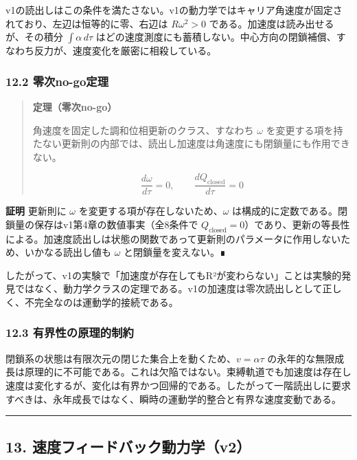 \documentclass[
  a4paper,
]{ltjsarticle}
\begin{document}
v1の読出しはこの条件を満たさない。v1の動力学ではキャリア角速度が固定されており、左辺は恒等的に零、右辺は
\(R\omega^2>0\) である。加速度は読み出せるが、その積分
\(\int\alpha\,d\tau\)
はどの速度測度にも蓄積しない。中心方向の閉鎖補償、すなわち反力が、速度変化を厳密に相殺している。

\subsubsection{12.2 零次no-go定理}\label{ux96f6ux6b21no-goux5b9aux7406}

\begin{quote}
\textbf{定理（零次no-go）}

角速度を固定した調和位相更新のクラス、すなわち \(\omega\)
を変更する項を持たない更新則の内部では、読出し加速度は角速度にも閉鎖量にも作用できない。

\[
\frac{d\omega}{d\tau}=0,
\qquad
\frac{dQ_{\mathrm{closed}}}{d\tau}=0
\]
\end{quote}

\textbf{証明} 更新則に \(\omega\)
を変更する項が存在しないため、\(\omega\)
は構成的に定数である。閉鎖量の保存はv1第4章の数値事実（全8条件で
\(Q_{\mathrm{closed}}=0\)）であり、更新の等長性による。加速度読出しは状態の関数であって更新則のパラメータに作用しないため、いかなる読出し値も
\(\omega\) と閉鎖量を変えない。∎

したがって、v1の実験で「加速度が存在してもR²が変わらない」ことは実験的発見ではなく、動力学クラスの定理である。v1の加速度は零次読出しとして正しく、不完全なのは運動学的接続である。

\subsubsection{12.3
有界性の原理的制約}\label{ux6709ux754cux6027ux306eux539fux7406ux7684ux5236ux7d04}

閉鎖系の状態は有限次元の閉じた集合上を動くため、\(v=\alpha\tau\)
の永年的な無限成長は原理的に不可能である。これは欠陥ではない。束縛軌道でも加速度は存在し速度は変化するが、変化は有界かつ回帰的である。したがって一階読出しに要求すべきは、永年成長ではなく、瞬時の運動学的整合と有界な速度変動である。

\begin{center}\rule{0.5\linewidth}{0.5pt}\end{center}

\subsection{13.
速度フィードバック動力学（v2）}\label{ux901fux5ea6ux30d5ux30a3ux30fcux30c9ux30d0ux30c3ux30afux52d5ux529bux5b66v2}
\end{document}
